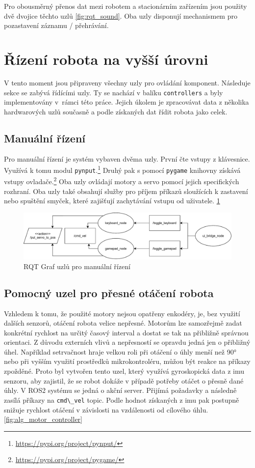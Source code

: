 Pro obousměrný přenos dat mezi robotem a stacionárním zařízením jsou použity dvě dvojice těchto uzlů \ref{fig:rqt_sound}. Oba uzly disponují mechanismem pro pozastavení záznamu / přehrávání. 

\section{Řízení robota na vyšší úrovni}
V tento moment jsou připraveny všechny uzly pro ovládání komponent. Následuje sekce se zabývá řídícími uzly. Ty se nachází v balíku \verb|controllers| a byly implementovány v~rámci této práce. Jejich úkolem je zpracovávat data z několika hardwarových uzlů současně a podle získaných dat řídit robota jako celek.

\subsection*{Manuální řízení}
Pro manuální řízení je systém vybaven dvěma uzly. První čte vstupy z klávesnice. Využívá k tomu modul \verb|pynput|.\footnote{\url{https://pypi.org/project/pynput/}} Druhý pak s pomocí \verb|pygame| knihovny získává vstupy ovladače.\footnote{\url{https://pypi.org/project/pygame/}} Oba uzly ovládají motory a servo pomocí jejich specifických rozhraní. Oba uzly také obsahují služby pro příjem příkazů sloužících k zastavení nebo spuštění smyček, které zajišťují zachytávání vstupu od uživatele. \ref{fig:rqt_manual}

\begin{figure}[h!]
	\centering
	\includegraphics[scale=0.65]{obrazky-figures/manual_control_diagram.pdf}
	\caption{RQT Graf uzlů pro manuální řízení}
	\label{fig:rqt_manual}
\end{figure}

\subsection*{Pomocný uzel pro přesné otáčení robota}
Vzhledem k tomu, že použité motory nejsou opatřeny enkodéry, je, bez využití dalších senzorů, otáčení robota velice nepřesné. Motorům lze samozřejmě zadat konkrétní rychlost na určitý časový interval a dostat se tak na přibližně správnou orientaci. Z důvodu externích vlivů a nepřesností se opravdu jedná jen o přibližný úhel. Například setrvačnost hraje velkou roli při otáčení o úhly menší než 90° nebo při vyšším využití prostředků mikrokontroléru, můžou být reakce na příkazy zpožděné.
Proto byl vytvořen tento uzel, který využívá gyroskopická data z imu senzoru, aby zajistil, že se robot dokáže v případě potřeby otáčet o přesně dané úhly. V ROS2 systému se jedná o akční server. Přijímá požadavky a následně zasílá příkazy na \verb|cmd\_vel| topic. Podle hodnot získaných z imu pak postupně snižuje rychlost otáčení v závislosti na vzdálenosti od cílového úhlu. \ref{fig:alg_motor_controller}

